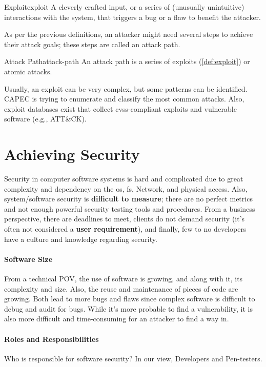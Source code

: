 \begin{definition}{Exploit}{exploit}
    A cleverly crafted input, or a series of (unusually unintuitive) interactions with the system, that triggers a bug or a flaw to benefit the attacker.
\end{definition}

As per the previous definitions, an attacker might need several steps to achieve their attack goals; these steps are called an attack path.

\begin{definition}{Attack Path}{attack-path}
    An attack path is a series of exploits (\cref{def:exploit}) or atomic attacks.
\end{definition}

Usually, an exploit can be very complex, but some patterns can be identified. CAPEC is trying to enumerate and classify the most common attacks. 
Also, exploit databases exist that collect \gls{cvss}-compliant exploits and vulnerable software (e.g., ATT\&CK).

\section{Achieving Security}
Security in computer software systems is hard and complicated due to great complexity and dependency on the \gls{os}, \gls{fs}, Network, and physical access. Also, system/software security is \textbf{difficult to measure}; there are no perfect metrics and not enough powerful security testing tools and procedures. From a business perspective, there are deadlines to meet, clients do not demand security (it's often not considered a \textbf{user requirement}), and finally, few to no developers have a culture and knowledge regarding security.

\paragraph{Software Size} 
From a technical POV, the use of software is growing, and along with it, its complexity and size. Also, the reuse and maintenance of pieces of code are growing. Both lead to more bugs and flaws since complex software is difficult to debug and audit for bugs. While it's more probable to find a vulnerability, it is also more difficult and time-consuming for an attacker to find a way in.

\paragraph{Roles and Responsibilities} 
Who is responsible for software security? In our view, Developers and Pen-testers.

